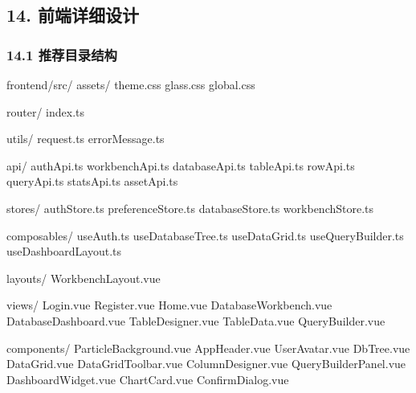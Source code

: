\documentclass[
  a4paper,
  UTF8]{ctexart}
\newenvironment{Shaded}{}{}
\newcommand{\NormalTok}[1]{#1}
\begin{document}
\hypertarget{ux524dux7aefux8be6ux7ec6ux8bbeux8ba1}{%
\subsection{14.
前端详细设计}\label{ux524dux7aefux8be6ux7ec6ux8bbeux8ba1}}

\hypertarget{ux63a8ux8350ux76eeux5f55ux7ed3ux6784-1}{%
\subsubsection{14.1
推荐目录结构}\label{ux63a8ux8350ux76eeux5f55ux7ed3ux6784-1}}

\begin{Shaded}
\begin{Highlighting}[]
\NormalTok{frontend/src/}
\NormalTok{  assets/}
\NormalTok{    theme.css}
\NormalTok{    glass.css}
\NormalTok{    global.css}

\NormalTok{  router/}
\NormalTok{    index.ts}

\NormalTok{  utils/}
\NormalTok{    request.ts}
\NormalTok{    errorMessage.ts}

\NormalTok{  api/}
\NormalTok{    authApi.ts}
\NormalTok{    workbenchApi.ts}
\NormalTok{    databaseApi.ts}
\NormalTok{    tableApi.ts}
\NormalTok{    rowApi.ts}
\NormalTok{    queryApi.ts}
\NormalTok{    statsApi.ts}
\NormalTok{    assetApi.ts}

\NormalTok{  stores/}
\NormalTok{    authStore.ts}
\NormalTok{    preferenceStore.ts}
\NormalTok{    databaseStore.ts}
\NormalTok{    workbenchStore.ts}

\NormalTok{  composables/}
\NormalTok{    useAuth.ts}
\NormalTok{    useDatabaseTree.ts}
\NormalTok{    useDataGrid.ts}
\NormalTok{    useQueryBuilder.ts}
\NormalTok{    useDashboardLayout.ts}

\NormalTok{  layouts/}
\NormalTok{    WorkbenchLayout.vue}

\NormalTok{  views/}
\NormalTok{    Login.vue}
\NormalTok{    Register.vue}
\NormalTok{    Home.vue}
\NormalTok{    DatabaseWorkbench.vue}
\NormalTok{    DatabaseDashboard.vue}
\NormalTok{    TableDesigner.vue}
\NormalTok{    TableData.vue}
\NormalTok{    QueryBuilder.vue}

\NormalTok{  components/}
\NormalTok{    ParticleBackground.vue}
\NormalTok{    AppHeader.vue}
\NormalTok{    UserAvatar.vue}
\NormalTok{    DbTree.vue}
\NormalTok{    DataGrid.vue}
\NormalTok{    DataGridToolbar.vue}
\NormalTok{    ColumnDesigner.vue}
\NormalTok{    QueryBuilderPanel.vue}
\NormalTok{    DashboardWidget.vue}
\NormalTok{    ChartCard.vue}
\NormalTok{    ConfirmDialog.vue}
\end{Highlighting}
\end{Shaded}
\end{document}
